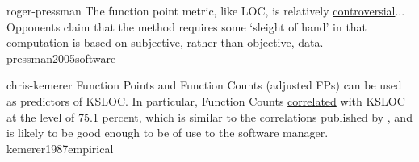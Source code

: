 \documentclass{article}
\begin{document}

\lnQuote
  {roger-pressman}
  {The function point metric, like LOC, is relatively \ul{controversial}... Opponents claim that the method requires some `sleight of hand' in that computation is based on \ul{subjective}, rather than \ul{objective}, data.}
  {pressman2005software}

\lnQuote
  {chris-kemerer}
  {Function Points and Function Counts (adjusted FPs) can be used as predictors of KSLOC. In particular, Function Counts \ul{correlated} with KSLOC at the level of \ul{75.1 percent}, which is similar to the correlations published by \citet{albrecht1983software}, and is likely to be good enough to be of use to the software manager.}
  {kemerer1987empirical}
\end{document}
